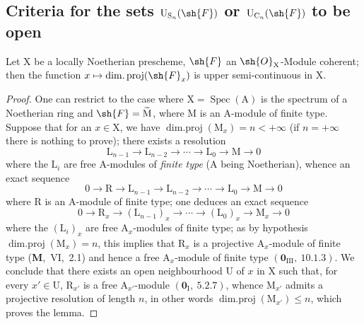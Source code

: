 \subsection{Criteria for the sets \texorpdfstring{$\mathrm{U}_{\mathrm{S}_n}(\sh{F})$}{U\_Sn(F)} or \texorpdfstring{$\mathrm{U}_{\mathrm{C}_n}(\sh{F})$}{U\_Cn(F)} to be open}
\label{subsection:IV.6.11}
\label{IV.6.11}

\begin{lemma}[6.11.1]
\label{IV.6.11.1}
Let $\mathrm{X}$ be a locally Noetherian prescheme, $\sh{F}$ an $\sh{O}_\mathrm{X}$-Module
coherent; then the function $x\mapsto\operatorname{dim.proj}(\sh{F}_x)$ is upper semi-continuous in $\mathrm{X}$.
\end{lemma}

\begin{proof}
One can restrict to the case where $\mathrm{X}=\operatorname{Spec}(\mathrm{A})$ is the spectrum of a Noetherian ring
and $\sh{F}=\widetilde{\mathrm{M}}$, where $\mathrm{M}$ is an $\mathrm{A}$-module of finite type. Suppose that for an $x\in\mathrm{X}$, we have
$\operatorname{dim.proj}(\mathrm{M}_x)=n<+\infty$ (if $n=+\infty$ there is nothing to prove); there exists a resolution
\[
  \mathrm{L}_{n-1}\to\mathrm{L}_{n-2}\to\cdots\to\mathrm{L}_0\to\mathrm{M}\to 0
\]
where the $\mathrm{L}_i$ are free $\mathrm{A}$-modules of \emph{finite type} ($\mathrm{A}$ being Noetherian), whence an exact sequence
\[
  0\to\mathrm{R}\to\mathrm{L}_{n-1}\to\mathrm{L}_{n-2}\to\cdots\to\mathrm{L}_0\to\mathrm{M}\to 0
\]
where $\mathrm{R}$ is an $\mathrm{A}$-module of finite type; one deduces an exact sequence
\[
  0\to\mathrm{R}_x\to(\mathrm{L}_{n-1})_x\to\cdots\to(\mathrm{L}_0)_x\to\mathrm{M}_x\to 0
\]
where the $(\mathrm{L}_i)_x$ are free $\mathrm{A}_x$-modules of finite type; as by hypothesis
$\operatorname{dim.proj}(\mathrm{M}_x)=n$, this implies that $\mathrm{R}_x$ is a projective $\mathrm{A}_x$-module of finite type
(\textbf{M},~VI,~2.1) and hence a free $\mathrm{A}_x$-module of finite type $(\mathbf{0}_{\mathrm{III}},~10.1.3)$. We conclude
that there exists an open neighbourhood $\mathrm{U}$ of $x$ in $\mathrm{X}$ such that, for every $x'\in\mathrm{U}$, $\mathrm{R}_{x'}$ is a
free $\mathrm{A}_{x'}$-module $(\mathbf{0}_\mathrm{I},~5.2.7)$, whence $\mathrm{M}_{x'}$ admits a projective resolution of length $n$,
in other words $\operatorname{dim.proj}(\mathrm{M}_{x'})\leqslant n$, which proves the lemma.
\end{proof}

